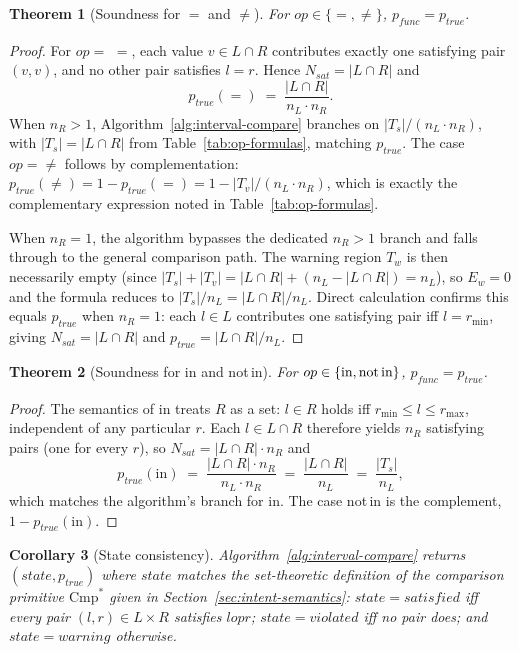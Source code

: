 \documentclass[pdflatex,sn-basic]{sn-jnl}%
\theoremstyle{thmstyleone}%
\newtheorem{theorem}{Theorem}%
\newtheorem{corollary}[theorem]{Corollary}%
\theoremstyle{thmstyletwo}%
\theoremstyle{thmstylethree}%
\begin{document}
\begin{theorem}[Soundness for $=$ and $\neq$]\label{thm:sound-eq}
For $op \in \{=, \neq\}$, $p_{\mathit{func}} = p_{\mathit{true}}$.
\end{theorem}

\begin{proof}
For $op = ${} $=$, each value $v \in L \cap R$ contributes exactly one satisfying pair $(v, v)$, and no other pair satisfies $l = r$. Hence $N_{\mathit{sat}} = |L \cap R|$ and
\[
p_{\mathit{true}}(=) \;=\; \frac{|L \cap R|}{n_L \cdot n_R}.
\]
When $n_R > 1$, Algorithm~\ref{alg:interval-compare} branches on $|T_s| / (n_L \cdot n_R)$, with $|T_s| = |L \cap R|$ from Table~\ref{tab:op-formulas}, matching $p_{\mathit{true}}$. The case $op = \neq$ follows by complementation: $p_{\mathit{true}}(\neq) = 1 - p_{\mathit{true}}(=) = 1 - |T_v| / (n_L \cdot n_R)$, which is exactly the complementary expression noted in Table~\ref{tab:op-formulas}.

When $n_R = 1$, the algorithm bypasses the dedicated $n_R > 1$ branch and falls through to the general comparison path. The warning region $T_w$ is then necessarily empty (since $|T_s| + |T_v| = |L \cap R| + (n_L - |L \cap R|) = n_L$), so $E_w = 0$ and the formula reduces to $|T_s| / n_L = |L \cap R| / n_L$. Direct calculation confirms this equals $p_{\mathit{true}}$ when $n_R = 1$: each $l \in L$ contributes one satisfying pair iff $l = r_{\min}$, giving $N_{\mathit{sat}} = |L \cap R|$ and $p_{\mathit{true}} = |L \cap R| / n_L$.
\end{proof}

\begin{theorem}[Soundness for in and not\,in]\label{thm:sound-in}
For $op \in \{\text{in}, \text{not\,in}\}$, $p_{\mathit{func}} = p_{\mathit{true}}$.
\end{theorem}

\begin{proof}
The semantics of in treats $R$ as a set: $l \in R$ holds iff $r_{\min} \leq l \leq r_{\max}$, independent of any particular $r$. Each $l \in L \cap R$ therefore yields $n_R$ satisfying pairs (one for every $r$), so $N_{\mathit{sat}} = |L \cap R| \cdot n_R$ and
\[
p_{\mathit{true}}(\text{in}) \;=\; \frac{|L \cap R| \cdot n_R}{n_L \cdot n_R} \;=\; \frac{|L \cap R|}{n_L} \;=\; \frac{|T_s|}{n_L},
\]
which matches the algorithm's branch for in. The case not\,in is the complement, $1 - p_{\mathit{true}}(\text{in})$.
\end{proof}

\begin{corollary}[State consistency]\label{cor:state-consistency}
Algorithm~\ref{alg:interval-compare} returns $(\mathit{state}, p_{\mathit{true}})$ where $\mathit{state}$ matches the set-theoretic definition of the comparison primitive $\text{Cmp}^*$ given in Section~\ref{sec:intent-semantics}: $\mathit{state} = \mathit{satisfied}$ iff every pair $(l, r) \in L \times R$ satisfies $l \mathrel{op} r$; $\mathit{state} = \mathit{violated}$ iff no pair does; and $\mathit{state} = \mathit{warning}$ otherwise.
\end{corollary}
\end{document}
